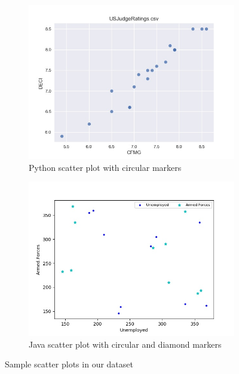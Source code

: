 \documentclass[12pt, a4paper,oneside]{report}
\begin{document}
\begin{figure}[!htb]
	\begin{subfigure}{.6\textwidth}
		\centering
		\includegraphics[width=.8\linewidth]{scatter11}
		\caption{Python scatter plot with circular markers }
		\label{fig:scatter1}
	\end{subfigure}%
	\begin{subfigure}{.5\textwidth}
		\centering
		\includegraphics[width=.8\linewidth]{scatter1}
		\caption{Java scatter plot with circular and diamond markers}
		\label{fig:scatter2}
	\end{subfigure}
	\caption{Sample scatter plots in our dataset}
	\label{fig:scatters}
\end{figure}
\end{document}
